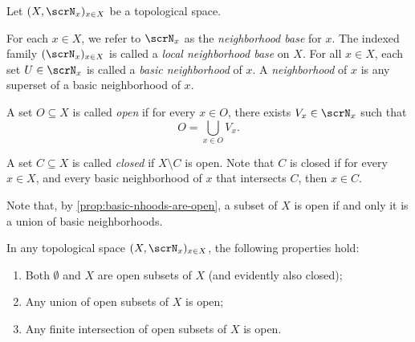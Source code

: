 \begin{definition}
  Let $( X, \scrN_x)_{x\in X}$ be a topological space.

  For each $x\in X$, we refer to $\scrN_x$ as the \emph{neighborhood base} for $x$.
  The indexed family $(\scrN_x)_{x\in X}$ is called a \emph{local neighborhood base} on $X$.
  For all $x\in X$, each set $U\in \scrN_x$ is called a \emph{basic neighborhood} of $x$.
  A \emph{neighborhood} of $x$ is any superset of a basic neighborhood of $x$.

\end{definition}

\begin{definition}
  A set $O\subseteq X$ is called \emph{open} if for every $x\in O$, there exists $V_x\in \scrN_x$ such that
  \[
    O=\bigcup\limits_{x\in O}V_x\text{.}
  \]

  A set $C\subseteq X$ is called \emph{closed} if $X\setminus C$ is open.
  Note that $C$ is closed if for every $x\in X$, and every basic neighborhood of $x$ that intersects $C$, then $x\in C$.
\end{definition}

Note that, by \cref{prop:basic-nhoods-are-open}, a subset of $X$ is open if and only it is a union of basic neighborhoods.

\begin{proposition}
  \label{prop:properties-of-open-sets}

  In any topological space $(X, \scrN_x)_{x\in X}$, the following properties hold:

  \begin{enumerate}
  \item
    Both $\emptyset$ and $X$ are open subsets of $X$ (and evidently also closed);
  \item
    Any union of open subsets of $X$ is open;
  \item
    Any finite intersection of open subsets of $X$ is open.

  \end{enumerate}
\end{proposition}

